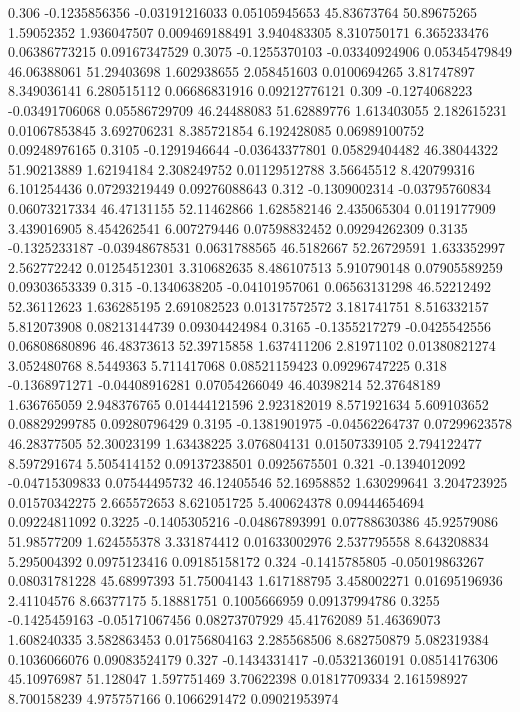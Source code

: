 {0.306 -0.1235856356 -0.03191216033 0.05105945653 45.83673764 50.89675265 1.59052352 1.936047507 0.009469188491 3.940483305 8.310750171 6.365233476 0.06386773215 0.09167347529
0.3075 -0.1255370103 -0.03340924906 0.05345479849 46.06388061 51.29403698 1.602938655 2.058451603 0.0100694265 3.81747897 8.349036141 6.280515112 0.06686831916 0.09212776121
0.309 -0.1274068223 -0.03491706068 0.05586729709 46.24488083 51.62889776 1.613403055 2.182615231 0.01067853845 3.692706231 8.385721854 6.192428085 0.06989100752 0.09248976165
0.3105 -0.1291946644 -0.03643377801 0.05829404482 46.38044322 51.90213889 1.62194184 2.308249752 0.01129512788 3.56645512 8.420799316 6.101254436 0.07293219449 0.09276088643
0.312 -0.1309002314 -0.03795760834 0.06073217334 46.47131155 52.11462866 1.628582146 2.435065304 0.0119177909 3.439016905 8.454262541 6.007279446 0.07598832452 0.09294262309
0.3135 -0.1325233187 -0.03948678531 0.0631788565 46.5182667 52.26729591 1.633352997 2.562772242 0.01254512301 3.310682635 8.486107513 5.910790148 0.07905589259 0.09303653339
0.315 -0.1340638205 -0.04101957061 0.06563131298 46.52212492 52.36112623 1.636285195 2.691082523 0.01317572572 3.181741751 8.516332157 5.812073908 0.08213144739 0.09304424984
0.3165 -0.1355217279 -0.0425542556 0.06808680896 46.48373613 52.39715858 1.637411206 2.81971102 0.01380821274 3.052480768 8.5449363 5.711417068 0.08521159423 0.09296747225
0.318 -0.1368971271 -0.04408916281 0.07054266049 46.40398214 52.37648189 1.636765059 2.948376765 0.01444121596 2.923182019 8.571921634 5.609103652 0.08829299785 0.09280796429
0.3195 -0.1381901975 -0.04562264737 0.07299623578 46.28377505 52.30023199 1.63438225 3.076804131 0.01507339105 2.794122477 8.597291674 5.505414152 0.09137238501 0.0925675501
0.321 -0.1394012092 -0.04715309833 0.07544495732 46.12405546 52.16958852 1.630299641 3.204723925 0.01570342275 2.665572653 8.621051725 5.400624378 0.09444654694 0.09224811092
0.3225 -0.1405305216 -0.04867893991 0.07788630386 45.92579086 51.98577209 1.624555378 3.331874412 0.01633002976 2.537795558 8.643208834 5.295004392 0.0975123416 0.09185158172
0.324 -0.1415785805 -0.05019863267 0.08031781228 45.68997393 51.75004143 1.617188795 3.458002271 0.01695196936 2.41104576 8.66377175 5.18881751 0.1005666959 0.09137994786
0.3255 -0.1425459163 -0.05171067456 0.08273707929 45.41762089 51.46369073 1.608240335 3.582863453 0.01756804163 2.285568506 8.682750879 5.082319384 0.1036066076 0.09083524179
0.327 -0.1434331417 -0.05321360191 0.08514176306 45.10976987 51.128047 1.597751469 3.70622398 0.01817709334 2.161598927 8.700158239 4.975757166 0.1066291472 0.09021953974
}
